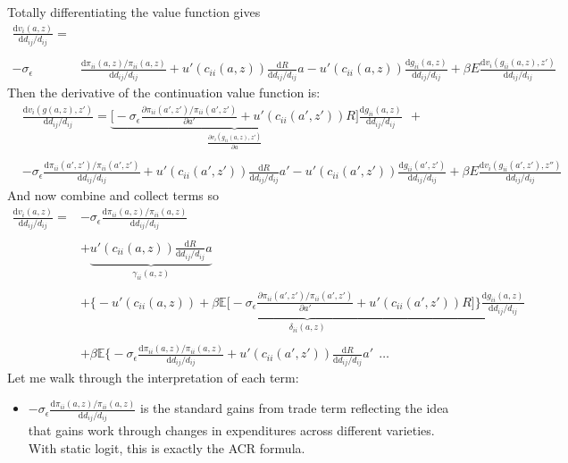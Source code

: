 \documentclass[12pt,pdftex]{article}
\begin{document}
\begin{onehalfspacing}
\hrulefill

Totally differentiating the value function gives
\begin{align}
\frac{\mathrm{d} v_i(a, z)}{\mathrm{d} d_{ij} / d_{ij}} =& \nonumber  \\
\nonumber \\
 -\sigma_{\epsilon} & \frac{\mathrm{d} \pi_{ii}(a,z) / \pi_{ii}(a,z)}{\mathrm{d}d_{ij} / d_{ij}}  + u'(c_{ii}(a,z))\frac{\mathrm{d} R}{\mathrm{d} d_{ij} / d_{ij}}a - u'(c_{ii}(a,z))\frac{\mathrm{d} g_{ii}(a,z)}{\mathrm{d} d_{ij} / d_{ij}}
+ \beta E \frac{\mathrm{d} v_i(g_{ii}(a,z), z')}{\mathrm{d} d_{ij} / d_{ij}}
\end{align}
Then the derivative of the continuation value function is:
\begin{align}
& \frac{\mathrm{d} v_i(g(a,z), z')}{\mathrm{d} d_{ij} / d_{ij}} = \underbrace{\bigg [-\sigma_{\epsilon} \frac{\partial \pi_{ii}(a',z') / \pi_{ii}(a',z')}{\partial a'} + u'(c_{ii}(a',z'))R \bigg ]}_{\frac{\partial v_i(g_{ii}(a,z), z')}{\partial a}}\frac{\mathrm{d} g_{ii}(a,z)}{\mathrm{d} d_{ij} / d_{ij}} \ \ + \\
\nonumber \\
& -\sigma_{\epsilon} \frac{\mathrm{d} \pi_{ii}(a',z') / \pi_{ii}(a',z')}{\mathrm{d}d_{ij} / d_{ij}}   + u'(c_{ii}(a',z'))\frac{\mathrm{d} R}{\mathrm{d} d_{ij} / d_{ij}}a' - u'(c_{ii}(a',z'))\frac{\mathrm{d} g_{ii}(a',z')}{\mathrm{d} d_{ij} / d_{ij}}
+ \beta E \frac{\mathrm{d} v_i(g_{ii}(a',z'), z'')}{\mathrm{d} d_{ij} / d_{ij}}
\end{align}
And now combine and collect terms so
\begin{align}
\frac{\mathrm{d} v_i(a, z)}{\mathrm{d} d_{ij} / d_{ij}} =& -\sigma_{\epsilon} \frac{\mathrm{d} \pi_{ii}(a,z) / \pi_{ii}(a,z)}{\mathrm{d}d_{ij} / d_{ij}} \\
\nonumber \\
& + \underbrace{u'(c_{ii}(a,z))\frac{\mathrm{d} R}{\mathrm{d} d_{ij} / d_{ij}}a}_{\gamma_{ii}(a,z)}  \\
\nonumber \\
& + \underbrace{\bigg \{- u'(c_{ii}(a,z)) + \beta \mathbb{E} \big [-\sigma_{\epsilon} \frac{\partial \pi_{ii}(a',z') / \pi_{ii}(a',z')}{\partial a'} + u'(c_{ii}(a',z'))R \big ] \bigg \}\frac{\mathrm{d} g_{ii}(a,z)}{\mathrm{d} d_{ij} / d_{ij}}}_{\delta_{ii}(a,z)} \\
\nonumber \\
& + \beta \mathbb{E} \bigg \{ -\sigma_{\epsilon} \frac{\mathrm{d} \pi_{ii}(a,z) / \pi_{ii}(a,z)}{\mathrm{d}d_{ij} / d_{ij}} +  u'(c_{ii}(a',z'))\frac{\mathrm{d} R}{\mathrm{d} d_{ij} / d_{ij}}a' \ \  \ldots
\label{eq:apx-welfare-vterms}
\end{align}
Let me walk through the interpretation of each term:
\begin{itemize}
\item $-\sigma_{\epsilon} \frac{\mathrm{d} \pi_{ii}(a,z) / \pi_{ii}(a,z)}{\mathrm{d}d_{ij} / d_{ij}}$ is the standard gains from trade term reflecting the idea that gains work through changes in expenditures across different varieties. With static logit, this is exactly the ACR formula.


\end{itemize}
\end{onehalfspacing}
\end{document}
